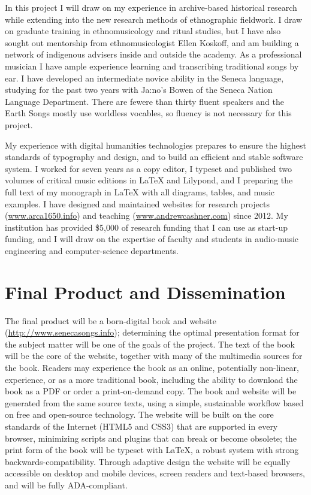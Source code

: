 \documentclass{neh}
\begin{document}
In this project I will draw on my experience in archive-based historical
research while extending into the new research methods of ethnographic
fieldwork.
I draw on graduate training in ethnomusicology and ritual studies, but I have
also sought out mentorship from ethnomusicologist Ellen Koskoff, and am
building a network of indigenous advisers inside and outside the academy.
As a professional musician I have ample experience learning and transcribing
traditional songs by ear.
I have developed an intermediate novice ability in the Seneca language,
studying for the past two years with Ja:no’s Bowen of the Seneca Nation
Language Department.
There are fewere than thirty fluent speakers and the Earth Songs mostly use
worldless vocables, so fluency is not necessary for this project.

My experience with digital humanities technologies prepares to ensure the
highest standards of typography and design, and to build an efficient and
stable software system.
I worked for seven years as a copy editor, I typeset and published two volumes
of critical music editions in \LaTeX{} and Lilypond, and I preparing the full
text of my monograph in \LaTeX{} with all diagrams, tables, and music
examples.
I have designed and maintained websites for research projects
(\url{www.arca1650.info}) and teaching (\url{www.andrewcashner.com}) since
2012.
My institution has provided \$5,000 of research funding that I can use as
start-up funding, and I will draw on the expertise of faculty and students in
audio-music engineering and computer-science departments.
\section{Final Product and Dissemination}

The final product will be a born-digital book and website
(\url{http://www.senecasongs.info}); determining the optimal presentation
format for the subject matter will be one of the goals of the project.
The text of the book will be the core of the website, together with many of
the multimedia sources for the book.
Readers may experience the book as an online, potentially non-linear,
experience, or as a more traditional book, including the ability to download
the book as a PDF or order a print-on-demand copy.
The book and website will be generated from the same source texts, using a
simple, sustainable workflow based on free and open-source technology.
The website will be built on the core standards of the Internet (HTML5 and
CSS3) that are supported in every browser, minimizing scripts and plugins that
can break or become obsolete; the print form of the book will be typeset with
\LaTeX{}, a robust system with strong backwards-compatibility.
Through adaptive design the website will be equally accessible on desktop and
mobile devices, screen readers and text-based browsers, and will be fully
ADA-compliant.
\end{document}
